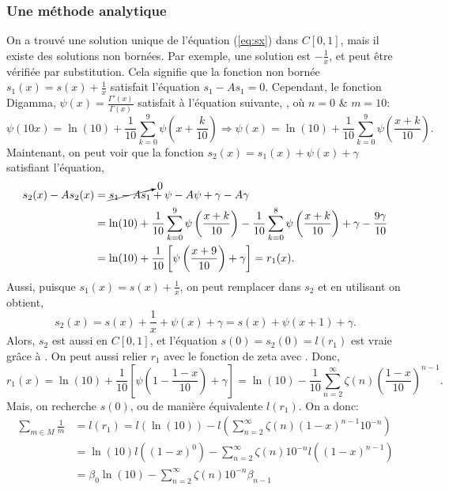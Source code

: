 \subsubsection{Une m\'ethode analytique}
On a trouv\'e une solution unique de l'\'equation (\ref{eq:sx}) dans $C[0,1]$,
mais il existe des solutions non born\'ees. Par exemple, une solution est
$-\frac{1}{x}$, et peut \^{e}tre v\'erifi\'ee par substitution. Cela signifie que
la fonction non born\'ee $s_{1}(x) = s(x) + \frac{1}{x}$ satisfait l'\'equation
$s_{1}-As_{1}=0$. Cependant, le fonction Digamma, $\psi(x) =
\frac{\Gamma'(x)}{\Gamma(x)}$ satisfait à l'équation suivante,
\cite[6.4.8]{handbook}, o\`u $n=0$ \& $m = 10$:
\begin{equation*}
	\psi(10x) = \ln(10) + \frac{1}{10}\sum_{k=0}^{9}\psi\left(x +
	\frac{k}{10}\right) \Rightarrow \psi(x) = \ln(10) +
	\frac{1}{10}\sum_{k=0}^{9}\psi\left( \frac{x+k}{10}\right).
\end{equation*}
Maintenant, on peut voir que la fonction $s_{2}(x)=s_{1}(x) +\psi(x) +\gamma$
satisfiant l'\'equation,
\begin{align*}
		s_{2}(x) - As_{2}(x) &= \cancelto{0}{s_{1} - As_{1}}+ \psi - A\psi +
		\gamma - A\gamma \\
		&= \ln(10) + \frac{1}{10}\sum_{k=0}^{9}\psi\left( \frac{x+k}{10} \right)
		- \frac{1}{10}\sum_{k=0}^{8}\psi\left( \frac{x+k}{10} \right) + \gamma -
		\frac{9\gamma}{10}\\
		&= \ln(10) + \frac{1}{10} \left[ \psi\left( \frac{x+9}{10} \right) +
		\gamma \right] = r_{1}(x).
\end{align*}
Aussi, puisque $s_{1}(x) = s(x) + \frac{1}{x}$, on peut remplacer dans $s_{2}$
et en utilisant \cite[6.3.5]{handbook} on obtient,
\[
	s_{2}(x)= s(x) + \frac{1}{x} + \psi(x) + \gamma = s(x) + \psi(x+1) + \gamma.
\]
	Alors, $s_{2}$ est aussi en $C[0,1]$, et l'\'equation $s(0) = s_{2}(0) =
	l(r_{1})$ est vraie gr\^{a}ce \`a \cite[6.3.2]{handbook}. On peut aussi
	relier $r_{1}$ avec le fonction de zeta avec \cite[6.3.14]{handbook}. Donc,
\[
	r_1(x) = \ln(10) + \frac{1}{10}\left[ \psi \left( 1-\frac{1-x}{10} \right)
+\gamma \right] = \ln(10) - \frac{1}{10}\sum_{n=2}^\infty \zeta(n) \left(
\frac{1-x}{10} \right)^{n-1}.
\]
Mais, on recherche $s(0)$, ou de manière équivalente $l(r_{1})$. On a donc:
\begin{equation*}
	\begin{split}
		\sum_{m\in M}\frac{1}{m} &= l(r_{1})=l(\ln(10))-l(\sum_{n=2}^{\infty}
		\zeta(n) (1-x)^{n-1} 10^{-n}) \\
		&=\ln(10)l((1-x)^0)-\sum_{n=2}^{\infty}\zeta(n)10^{-n} l((1-x)^{n-1})\\
		&=\beta_{0}\ln(10) -\sum_{n=2}^{\infty}\zeta(n)10^{-n} \beta_{n-1}
	\end{split}
\end{equation*}
